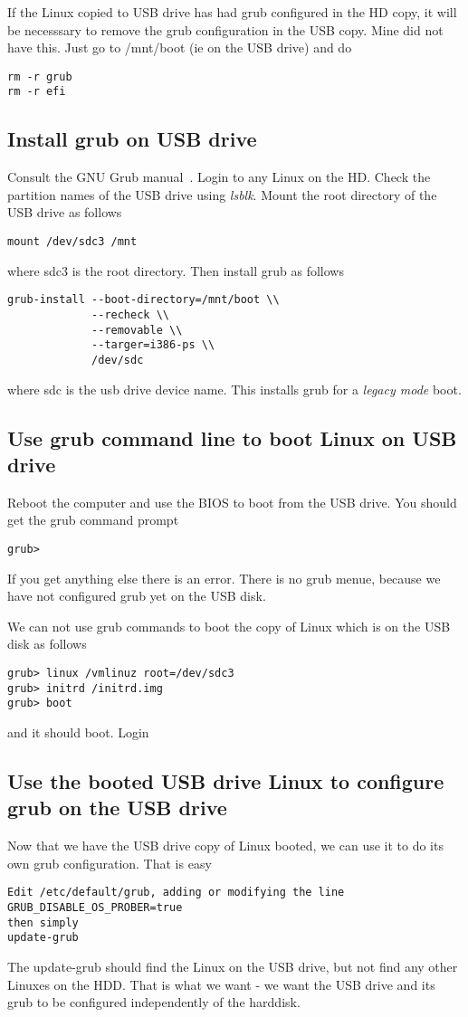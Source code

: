 \documentclass{article}  %
\begin{document}
If the Linux copied to USB drive has had grub configured in the HD copy, it will be necesssary to remove the grub configuration in the USB copy. Mine did not have this. Just go to /mnt/boot (ie on the USB drive) and do 
\begin{verbatim}
rm -r grub
rm -r efi
\end{verbatim}

\subsection{Install grub on USB drive}
Consult the GNU Grub manual~\cite{gnu:21}.
Login to any Linux on the HD.  Check the partition names of the USB drive using {\em lsblk}. Mount the root directory of the USB drive as follows
\begin{verbatim}
mount /dev/sdc3 /mnt
\end{verbatim} 
where sdc3 is the root directory. Then install grub as follows
\begin{verbatim}
grub-install --boot-directory=/mnt/boot \\
             --recheck \\
             --removable \\
             --targer=i386-ps \\
             /dev/sdc
\end{verbatim}
where sdc is the usb drive device name. 
This installs grub for a {\em legacy mode} boot.

\subsection{Use grub command line to boot Linux on USB drive}
Reboot the computer and use the BIOS to boot from the USB drive. You should get the grub command prompt
\begin{verbatim}
grub>
\end{verbatim}
If you get anything else there is an error.
There is no grub menue, because we have not configured grub yet on the USB disk.

We can not use grub commands to boot the copy of Linux which is on the USB disk as follows
\begin{verbatim}
grub> linux /vmlinuz root=/dev/sdc3
grub> initrd /initrd.img
grub> boot
\end{verbatim}
and it should boot. Login

\subsection{Use the booted USB drive Linux to configure grub on the USB drive}
Now that we have the USB drive copy of Linux booted, we can use it to do its own grub configuration.
That is easy
\begin{verbatim}
Edit /etc/default/grub, adding or modifying the line
GRUB_DISABLE_OS_PROBER=true
then simply
update-grub
\end{verbatim}
The update-grub should find the Linux on the USB drive, but not find any other Linuxes on the HDD. That is what we want - we want the USB drive and its grub to be configured independently of the harddisk.
\end{document}
